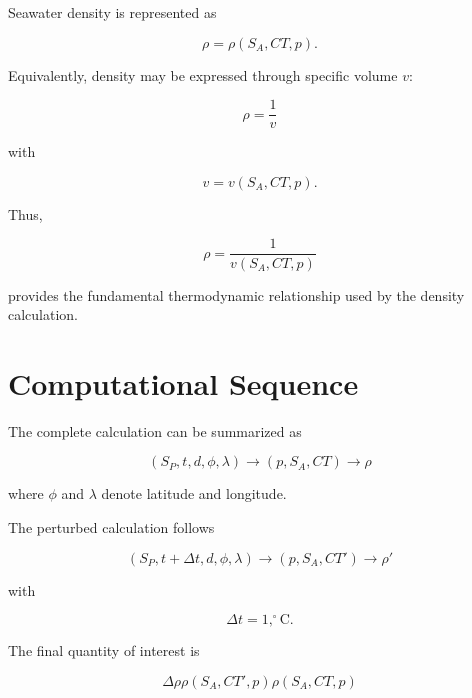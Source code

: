 \documentclass[11pt]{article}
\begin{document}
Seawater density is represented as

\begin{equation}
\rho=\rho(S_A,CT,p).
\end{equation}

Equivalently, density may be expressed through specific volume $v$:

\begin{equation}
\boxed{
\rho=\frac{1}{v}
}
\end{equation}

with

\begin{equation}
v=v(S_A,CT,p).
\end{equation}

Thus,

\begin{equation}
\boxed{
\rho=
\frac{1}
{v(S_A,CT,p)}
}
\end{equation}

provides the fundamental thermodynamic relationship used by the
density calculation.

\section{Computational Sequence}

The complete calculation can be summarized as

\begin{equation}
\boxed{
(S_P,t,d,\phi,\lambda)
\longrightarrow
(p,S_A,CT)
\longrightarrow
\rho
}
\end{equation}

where $\phi$ and $\lambda$ denote latitude and longitude.

The perturbed calculation follows

\begin{equation}
\boxed{
(S_P,t+\Delta t,d,\phi,\lambda)
\longrightarrow
(p,S_A,CT')
\longrightarrow
\rho'
}
\end{equation}

with

\begin{equation}
\Delta t=1,^\circ\mathrm{C}.
\end{equation}

The final quantity of interest is

\begin{equation}
\boxed{
\Delta\rho
\rho(S_A,CT',p)
\rho(S_A,CT,p)
}
\end{equation}
\end{document}
